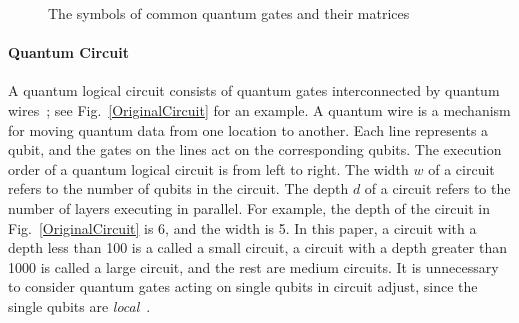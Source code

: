 \documentclass[runningheads]{llncs}
\begin{document}
{\begin{figure}
\begin{center}
\end{center}

\caption{The symbols of common quantum gates and their matrices}\label{common_gates}
\end{figure}	 

}

\paragraph{Quantum Circuit}
A quantum logical circuit 
consists of quantum gates interconnected by quantum wires~\cite{Daei2020}; see Fig.~\ref{OriginalCircuit} for an example.
A quantum wire is a mechanism for moving quantum data from one location to another.
Each line represents a qubit, and the gates on the lines act on the corresponding qubits.
The execution order of a quantum logical circuit  is from left to right.
The width $w$ of a circuit refers to the number of qubits in the circuit.
The depth $d$ of a circuit refers to the number of layers executing in parallel.
For example, the depth of the circuit in Fig.~\ref{OriginalCircuit} is 6, and the width is 5.
In this paper, a circuit with a depth less than 100 is a called a small circuit,
a circuit with a depth greater than 1000 is called a large circuit,
and the rest are medium circuits.
It is unnecessary to consider quantum gates acting on single qubits in circuit adjust, since the single qubits are \emph{local}~\cite{2013Optimization}.
\end{document}
